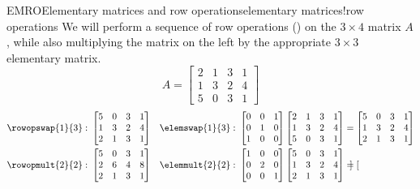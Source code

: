 \begin{example}{EMRO}{Elementary matrices and row operations}{elementary matrices!row operations}
We will perform a sequence of row operations () on the $3\times 4$ matrix $A$, while also multiplying the matrix on the left by the appropriate $3\times 3$ elementary matrix.
%
\begin{equation*}
A=
\begin{bmatrix}
2 & 1 & 3 & 1\\
1 & 3 & 2 & 4\\
5 & 0 & 3 & 1
\end{bmatrix}
\end{equation*}
%
\begin{align*}
\rowopswap{1}{3}:\ &
\begin{bmatrix}
5 & 0 & 3 & 1\\
1 & 3 & 2 & 4\\
2 & 1 & 3 & 1
\end{bmatrix}
&
\elemswap{1}{3}:\ &
\begin{bmatrix}
0 & 0 & 1\\
0 & 1 & 0\\
1 & 0 & 0
\end{bmatrix}
\begin{bmatrix}
2 & 1 & 3 & 1\\
1 & 3 & 2 & 4\\
5 & 0 & 3 & 1
\end{bmatrix}
=
\begin{bmatrix}
5 & 0 & 3 & 1\\
1 & 3 & 2 & 4\\
2 & 1 & 3 & 1
\end{bmatrix}\\
%
%
\rowopmult{2}{2}:\ &
\begin{bmatrix}
5 & 0 & 3 & 1\\
2 & 6 & 4 & 8\\
2 & 1 & 3 & 1
\end{bmatrix}
&
\elemmult{2}{2}:\ &
\begin{bmatrix}
1 & 0 & 0\\
0 & 2 & 0\\
0 & 0 & 1
\end{bmatrix}
\begin{bmatrix}
5 & 0 & 3 & 1\\
1 & 3 & 2 & 4\\
2 & 1 & 3 & 1
\end{bmatrix}
=
\begin{bmatrix}

\end{bmatrix}
\end{align*}
\end{example}
